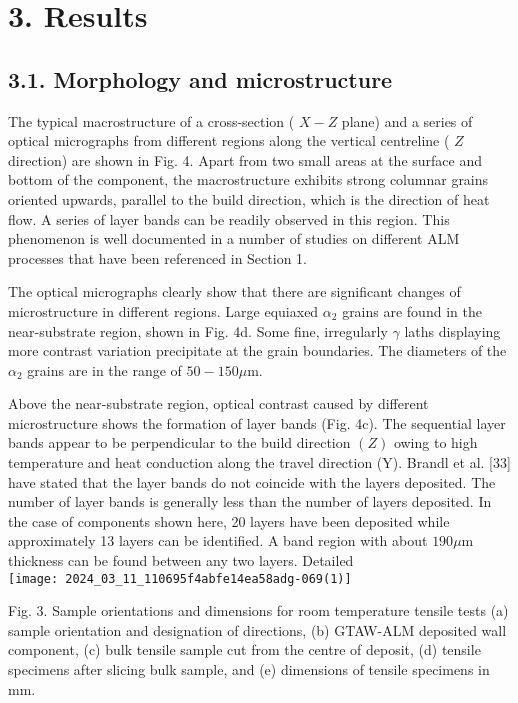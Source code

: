 \documentclass[10pt]{article}
\begin{document}
\section*{3. Results}
\subsection*{3.1. Morphology and microstructure}
The typical macrostructure of a cross-section ( $X-Z$ plane) and a series of optical micrographs from different regions along the vertical centreline ( $Z$ direction) are shown in Fig. 4. Apart from two small areas at the surface and bottom of the component, the macrostructure exhibits strong columnar grains oriented upwards, parallel to the build direction, which is the direction of heat flow. A series of layer bands can be readily observed in this region. This phenomenon is well documented in a number of studies on different ALM processes that have been referenced in Section 1.

The optical micrographs clearly show that there are significant changes of microstructure in different regions. Large equiaxed $\alpha_{2}$ grains are found in the near-substrate region, shown in Fig. 4d. Some fine, irregularly $\gamma$ laths displaying more contrast variation precipitate at the grain boundaries. The diameters of the $\alpha_{2}$ grains are in the range of $50-150 \mu \mathrm{m}$.

Above the near-substrate region, optical contrast caused by different microstructure shows the formation of layer bands (Fig. 4c). The sequential layer bands appear to be perpendicular to the build direction $(Z)$ owing to high temperature and heat conduction along the travel direction (Y). Brandl et al. [33] have stated that the layer bands do not coincide with the layers deposited. The number of layer bands is generally less than the number of layers deposited. In the case of components shown here, 20 layers have been deposited while approximately 13 layers can be identified. A band region with about $190 \mu \mathrm{m}$ thickness can be found between any two layers. Detailed\\
\texttt{[image: 2024\_03\_11\_110695f4abfe14ea58adg-069(1)]}

Fig. 3. Sample orientations and dimensions for room temperature tensile tests (a) sample orientation and designation of directions, (b) GTAW-ALM deposited wall component, (c) bulk tensile sample cut from the centre of deposit, (d) tensile specimens after slicing bulk sample, and (e) dimensions of tensile specimens in $\mathrm{mm}$.
\end{document}
